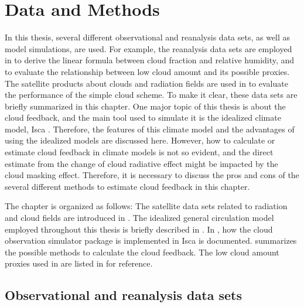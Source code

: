 \chapter{Data and Methods}
\label{ch:methods}

In this thesis, several different observational and reanalysis data sets, as well as model simulations, are used. For example, the reanalysis data sets are employed in  to derive the linear formula between cloud fraction and relative humidity, and to evaluate the relationship between low cloud amount and its possible proxies. The satellite products about clouds and radiation fields are used in  to evaluate the performance of the simple cloud scheme. To make it clear, these data sets are briefly summarized in this chapter. One major topic of this thesis is about the cloud feedback, and the main tool used to simulate it is the idealized climate model, Isca \citep{Vallis2018}. Therefore, the features of this climate model and the advantages of using the idealized models are discussed here. However, how to calculate or estimate cloud feedback in climate models is not so evident, and the direct estimate from the change of cloud radiative effect might be impacted by the cloud masking effect. Therefore, it is necessary to discuss the pros and cons of the several different methods to estimate cloud feedback in this chapter. %

The chapter is organized as follows: The satellite data sets related to radiation and cloud fields are introduced in . The idealized general circulation model employed throughout this thesis is briefly described in . In , how the cloud observation simulator package is implemented in Isca is documented.  summarizes the possible methods to calculate the cloud feedback. The low cloud amount proxies used in  are listed in  for reference.

\section{Observational and reanalysis data sets}
\label{sec:obs_reanalysis_dataset}

